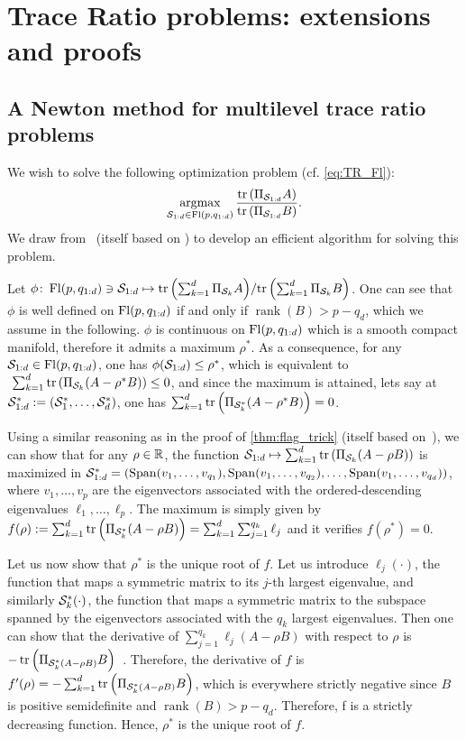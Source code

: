 \section{Trace Ratio problems: extensions and proofs}\label{app:TR}

\subsection{A Newton method for multilevel trace ratio problems}
We wish to solve the following optimization problem (cf. \autoref{eq:TR_Fl}):
\begin{equation}
	\argmax{\S_{1:d} \in \Fl(p, q_{1:d})} \frac{\tr{\Pi_{\S_{1:d}} A}}{\tr{\Pi_{\S_{1:d}} B}}.
\end{equation}
We draw from~\citet{ngo_trace_2012} (itself based on \citet{wang_trace_2007,jia_trace_2009}) to develop an efficient algorithm for solving this problem.

Let $\phi\colon \Fl(p, q_{1:d}) \ni \Sf \mapsto {\tr{\sum_{k=1}^d \Pi_{\S_k} A}}/{\tr{\sum_{k=1}^d \Pi_{\S_k} B}}$. One can see that $\phi$ is well defined on $\Fl(p, q_{1:d})$ if and only if $\operatorname{rank}(B) > p - q_d$, which we assume in the following. $\phi$ is continuous on $\Fl(p, \qf)$ which is a smooth compact manifold, therefore it admits a maximum $\rho^*$. As a consequence, for any ${\S_{1:d}} \in \Fl(p, \qf)$, one has $\phi(\Sf) \leq \rho^*$, which is equivalent to $~{\sum_{k=1}^d \tr{\Pi_{\S_k} (A - \rho^* B)} \leq 0}$, and since the maximum is attained, lets say at $\Sf^* := (\S_1^*, \dots, \S_d^*)$, one has ${\sum_{k=1}^d \tr{\Pi_{\S_k^*} (A - \rho^* B)} = 0}$.

Using a similar reasoning as in the proof of \autoref{thm:flag_trick} (itself based on~\citet{szwagier_curse_2024}), we can show that for any $\rho \in \R$, the function $\Sf \mapsto \sum_{k=1}^d \tr{\Pi_{\S_k} (A - \rho B)}$ is maximized in ${\S_{1:d}^*} = \lrp{\operatorname{Span}(v_1, \dots, v_{q_1}), \operatorname{Span}(v_1, \dots, v_{q_2}), \dots, \operatorname{Span}(v_1, \dots, v_{q_d})}$, where $v_1, \dots, v_p$ are the eigenvectors associated with the ordered-descending eigenvalues $\ell_1, \dots, \ell_p$. The maximum is simply given by $f(\rho) := \sum_{k=1}^d \tr{\Pi_{\S_k^*} (A - \rho B)} = \sum_{k=1}^d \sum_{j=1}^{q_k} \ell_j$ and it verifies $f(\rho^*) = 0$.

Let us now show that $\rho^*$ is the unique root of $f$. Let us introduce $\ell_j(\cdot)$, the function that maps a symmetric matrix to its $j$-th largest eigenvalue, and similarly $\S_k^*(\cdot)$, the function that maps a symmetric matrix to the subspace spanned by the eigenvectors associated with the $q_k$  largest eigenvalues. Then one can show that the derivative of $\sum_{j=1}^{q_k} \ell_j(A - \rho B)$ with respect to $\rho$ is $- \tr{\Pi_{\S_k^*(A - \rho B)} B}$~\citep{ngo_trace_2012}. Therefore, the derivative of $f$ is $f'(\rho) = - \sum_{k=1}^d \tr{\Pi_{\S_k^*(A - \rho B)} B}$, which is everywhere strictly negative since $B$ is positive semidefinite and $\operatorname{rank}(B) > p - q_d$. Therefore, f is a strictly decreasing function. Hence, $\rho^*$ is the unique root of $f$.

